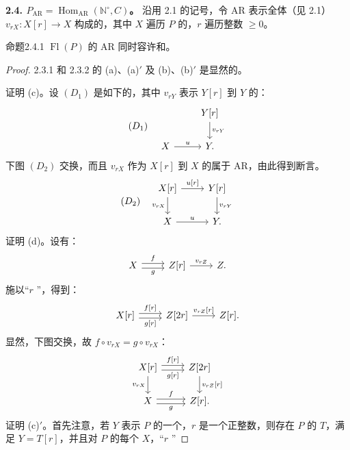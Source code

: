 \textbf{2.4.  $P_{\mathrm{AR}}=\operatorname{Hom}_{\mathrm{AR}}(\mathbb N^\circ,C)$。}
沿用 2.1 的记号，令 $\mathrm{AR}$ 表示全体（见 2.1）$v_{rX}:X[r]\to X$ 构成的，其中 $X$ 遍历 $P$ 的，$r$ 遍历整数 $\geq0$。
\begin{SGAresult}{命题}{2.4.1}
$\operatorname{Fl}(P)$ 的 $\mathrm{AR}$ 同时容许和。
\end{SGAresult}
\begin{proof}2.3.1 和 2.3.2 的 (a)、(a)$'$ 及 (b)、(b)$'$ 是显然的。

证明 (c)。设 $(D_1)$ 是如下的，其中 $v_{rY}$ 表示 $Y[r]$ 到 $Y$ 的：
\[
(D_1)\quad\begin{tikzcd}&Y[r]\arrow[d,"v_{rY}"]\\X\arrow[r,"u"]&Y.\end{tikzcd}
\]
下图 $(D_2)$ 交换，而且 $v_{rX}$ 作为 $X[r]$ 到 $X$ 的属于 $\mathrm{AR}$，由此得到断言。
\[
(D_2)\quad\begin{tikzcd}X[r]\arrow[r,"{u[r]}"]\arrow[d,"v_{rX}"']&Y[r]\arrow[d,"v_{rY}"]\\X\arrow[r,"u"]&Y.\end{tikzcd}
\]
证明 (d)。设有：
\[
\begin{tikzcd}X\arrow[r,shift left,"f"]\arrow[r,shift right,"g"']&Z[r]\arrow[r,"v_{rZ}"]&Z.\end{tikzcd}
\]
施以“$r$ ”，得到：
\[
\begin{tikzcd}X[r]\arrow[r,shift left,"{f[r]}"]\arrow[r,shift right,"{g[r]}"']&Z[2r]\arrow[r,"{v_{rZ}[r]}"]&Z[r].\end{tikzcd}
\]
显然，下图交换，故 $f\circ v_{rX}=g\circ v_{rX}$：
\[
\begin{tikzcd}X[r]\arrow[r,shift left,"{f[r]}"]\arrow[r,shift right,"{g[r]}"']\arrow[d,"v_{rX}"']&Z[2r]\arrow[d,"{v_{rZ}[r]}"]\\X\arrow[r,shift left,"f"]\arrow[r,shift right,"g"']&Z[r].\end{tikzcd}
\]
证明 (c)$'$。首先注意，若 $Y$ 表示 $P$ 的一个，$r$ 是一个正整数，则存在 $P$ 的 $T$，满足 $Y=T[r]$，并且对 $P$ 的每个 $X$，“$r$ ”

\end{proof}

